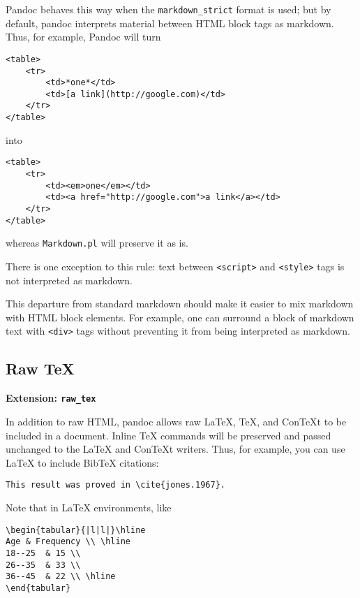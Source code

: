 \documentclass[]{article}
\begin{document}
Pandoc behaves this way when the \texttt{markdown\_strict} format is
used; but by default, pandoc interprets material between HTML block tags
as markdown. Thus, for example, Pandoc will turn

\begin{verbatim}
<table>
    <tr>
        <td>*one*</td>
        <td>[a link](http://google.com)</td>
    </tr>
</table>
\end{verbatim}

into

\begin{verbatim}
<table>
    <tr>
        <td><em>one</em></td>
        <td><a href="http://google.com">a link</a></td>
    </tr>
</table>
\end{verbatim}

whereas \texttt{Markdown.pl} will preserve it as is.

There is one exception to this rule: text between
\texttt{\textless{}script\textgreater{}} and
\texttt{\textless{}style\textgreater{}} tags is not interpreted as
markdown.

This departure from standard markdown should make it easier to mix
markdown with HTML block elements. For example, one can surround a block
of markdown text with \texttt{\textless{}div\textgreater{}} tags without
preventing it from being interpreted as markdown.

\subsection{Raw TeX}

\textbf{Extension: \texttt{raw\_tex}}

In addition to raw HTML, pandoc allows raw LaTeX, TeX, and ConTeXt to be
included in a document. Inline TeX commands will be preserved and passed
unchanged to the LaTeX and ConTeXt writers. Thus, for example, you can
use LaTeX to include BibTeX citations:

\begin{verbatim}
This result was proved in \cite{jones.1967}.
\end{verbatim}

Note that in LaTeX environments, like

\begin{verbatim}
\begin{tabular}{|l|l|}\hline
Age & Frequency \\ \hline
18--25  & 15 \\
26--35  & 33 \\
36--45  & 22 \\ \hline
\end{tabular}
\end{verbatim}
\end{document}
